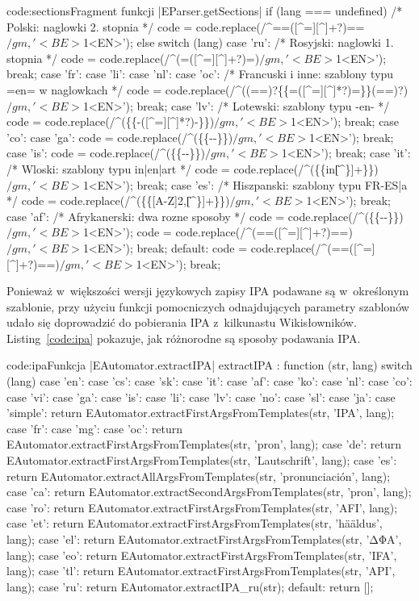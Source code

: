 \begin{jscode}{code:sections}{Fragment funkcji \kod|EParser.getSections|}
if (lang === undefined) {
	/* Polski: naglowki 2. stopnia */
	code = code.replace(/^==([^=][^\n]+?)==\s*$/gm, '<BE>$1<EN>');
} else {
	switch (lang) {
	case 'ru':
		/* Rosyjski: naglowki 1. stopnia */
		code = code.replace(/^(=([^=][^\n]+?)=)\s*$/gm, '<BE>$1<EN>');
		break;
	case 'fr':
	case 'li':
	case 'nl':
	case 'oc':
		/* Francuski i inne: szablony typu {{=en=}} w naglowkach */
		code = code.replace(/^((==\s*)?\{\{=([^=\-][^\n]*?)=\}\}(\s*==)?)\s*$/gm, '<BE>$1<EN>');
		break;
	case 'lv':
		/* Lotewski: szablony typu {{-en-}} */
		code = code.replace(/^(\{\{-([^=\-][^\n]*?)-\}\})\s*$/gm, '<BE>$1<EN>');
		break;
	case 'co':
	case 'ga':
		code = code.replace(/^(\{\{-\w\w-\}\})\s*$/gm, '<BE>$1<EN>');
		break;
	case 'is':
		code = code.replace(/^(\{\{--\}\})\s*$/gm, '<BE>$1<EN>');
		break;
	case 'it':
		/* Wloski: szablony typu {{in|en|art}} */
		code = code.replace(/^(\{\{in\|[^\}]+\}\})\s*$/gm, '<BE>$1<EN>');
		break;
	case 'es':
		/* Hiszpanski: szablony typu {{FR-ES|a}} */
		code = code.replace(/^(\{\{[A-Z\-]{2,}\|[^\}]+\}\})\s*$/gm, '<BE>$1<EN>');
		break;
	case 'af':
		/* Afrykanerski: dwa rozne sposoby */
		code = code.replace(/^(\{\{-\w\w-\}\})\s*$/gm, '<BE>$1<EN>');
		code = code.replace(/^(==([^=][^\n]+?)==)\s*$/gm, '<BE>$1<EN>');
		break;
	default:
		code = code.replace(/^(==([^=][^\n]+?)==)\s*$/gm, '<BE>$1<EN>');
		break;
	}
}
\end{jscode}%

Ponieważ w~większości wersji językowych zapisy IPA podawane są w~określonym szablonie, przy użyciu funkcji pomocniczych odnajdujących parametry szablonów udało się doprowadzić do pobierania IPA z~kilkunastu Wikisłowników. Listing~\ref{code:ipa} pokazuje, jak różnorodne są sposoby podawania IPA.

\begin{jscode}{code:ipa}{Funkcja \kod|EAutomator.extractIPA|}
extractIPA : function (str, lang) {
	switch (lang) {
	case 'en': case 'cs': case 'sk': case 'it': case 'af': case 'ko': case 'nl':
	case 'co': case 'vi': case 'ga': case 'is': case 'li': case 'lv': case 'no':
	case 'sl': case 'ja': case 'simple':
		return EAutomator.extractFirstArgsFromTemplates(str, 'IPA', lang);
	case 'fr': case 'mg': case 'oc':
		return EAutomator.extractFirstArgsFromTemplates(str, 'pron', lang);
	case 'de':
		return EAutomator.extractFirstArgsFromTemplates(str, 'Lautschrift', lang);
	case 'es':
		return EAutomator.extractAllArgsFromTemplates(str, 'pronunciación', lang);
	case 'ca':
		return EAutomator.extractSecondArgsFromTemplates(str, 'pron', lang);
	case 'ro':
		return EAutomator.extractFirstArgsFromTemplates(str, 'AFI', lang);
	case 'et':
		return EAutomator.extractFirstArgsFromTemplates(str, 'hääldus', lang);
	case 'el':
		return EAutomator.extractFirstArgsFromTemplates(str, 'ΔΦΑ', lang);
	case 'eo':
		return EAutomator.extractFirstArgsFromTemplates(str, 'IFA', lang);
	case 'tl':
		return EAutomator.extractFirstArgsFromTemplates(str, 'API', lang);
	case 'ru':
		return EAutomator.extractIPA_ru(str);
	default:
		return [];
	}
}
\end{jscode}

